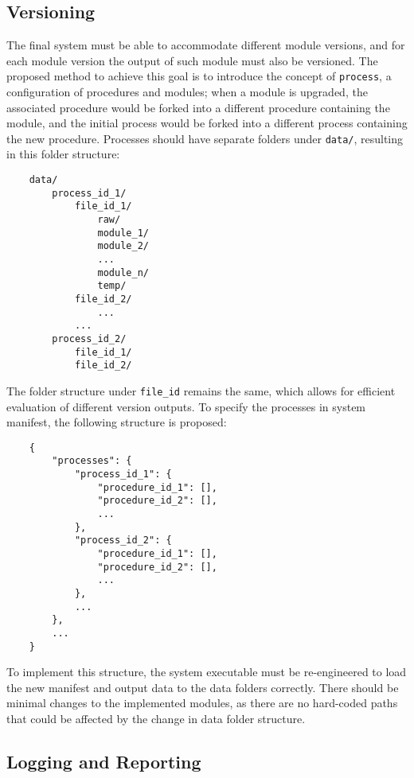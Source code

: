 \subsection{Versioning}

The final system must be able to accommodate different module versions, and for
each module version the output of such module must also be versioned. The proposed
method to achieve this goal is to introduce the concept of \texttt{process}, a
configuration of procedures and modules; when a module is upgraded, the associated
procedure would be forked into a different procedure containing the module, and
the initial process would be forked into a different process containing the new
procedure. Processes should have separate folders under \texttt{data/}, resulting
in this folder structure:

\begin{lstlisting}
    data/
        process_id_1/
            file_id_1/
                raw/
                module_1/
                module_2/
                ...
                module_n/
                temp/
            file_id_2/
                ...
            ...
        process_id_2/
            file_id_1/
            file_id_2/
\end{lstlisting}

The folder structure under \texttt{file\_id} remains the same, which allows for
efficient evaluation of different version outputs. To specify the processes in
system manifest, the following structure is proposed:

\begin{lstlisting}
    {
        "processes": {
            "process_id_1": {
                "procedure_id_1": [],
                "procedure_id_2": [],
                ...
            },
            "process_id_2": {
                "procedure_id_1": [],
                "procedure_id_2": [],
                ...
            },
            ...
        },
        ...
    }
\end{lstlisting}

To implement this structure, the system executable must be re-engineered to load
the new manifest and output data to the data folders correctly. There should be
minimal changes to the implemented modules, as there are no hard-coded paths that
could be affected by the change in data folder structure.

\subsection{Logging and Reporting}

